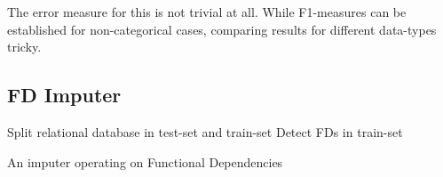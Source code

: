 The error measure for this is not trivial at all. While F1-measures can be established for non-categorical cases, comparing results for different data-types tricky.

\subsection{FD Imputer}


\begin{algorithm}[H]
 \DontPrintSemicolon
 \SetAlgoLined
 \BlankLine

 Split relational database in test-set and train-set\;
 Detect FDs in train-set\;
 \caption{An imputer operating on Functional Dependencies}
\end{algorithm}

